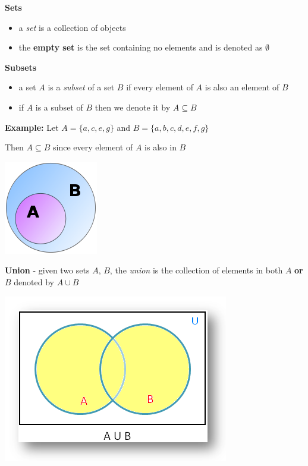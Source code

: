 \documentclass[12pt]{article}
\newenvironment{myindentpar}[1]%
     {\begin{list}{}%
             {\setlength{\leftmargin}{#1}}%
             \item[]%
     }
     {\end{list}}
\begin{document}
\textbf{Sets}

\begin{itemize}
\item a \textit{set} is a collection of objects
\item the \textbf{empty set} is the set containing no elements and is denoted as $\emptyset$
\end{itemize}

\vspace{.5cm}

\textbf{Subsets}

\begin{itemize}
\item a set $A$ is a \textit{subset} of a set $B$ if every element of $A$ is also an element of $B$
\item if $A$ is a subset of $B$ then we denote it by $A \subseteq B$
\end{itemize}

\begin{myindentpar}{2cm}
\textbf{Example:} Let $A = \{a,c,e,g\}$ and $B = \{a,b,c,d,e,f,g\}$

Then $A \subseteq B$ since every element of $A$ is also in $B$

\end{myindentpar}


\centerline{\includegraphics[scale=.5]{Subset.png}}

\vspace{.5cm}

\textbf{Union} - given two sets $A$, $B$, the \textit{union} is the collection of elements in both $A$ \textbf{or} $B$ denoted by $A \cup B$ 
\newline

\centerline{\includegraphics[scale=.5]{Union.png}}
\end{document}

